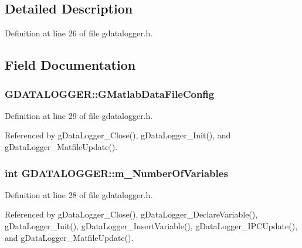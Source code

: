\subsection{Detailed Description}


Definition at line 26 of file gdatalogger.\-h.



\subsection{Field Documentation}
\hypertarget{structGDATALOGGER_a062fd3836dbd0b1bec129ab372bff04a}{
\subsubsection[{G\-Matlab\-Data\-File\-Config}]{ G\-D\-A\-T\-A\-L\-O\-G\-G\-E\-R\-::\-G\-Matlab\-Data\-File\-Config}}\label{structGDATALOGGER_a062fd3836dbd0b1bec129ab372bff04a}


Definition at line 29 of file gdatalogger.\-h.



Referenced by g\-Data\-Logger\-\_\-\-Close(), g\-Data\-Logger\-\_\-\-Init(), and g\-Data\-Logger\-\_\-\-Matfile\-Update().

\hypertarget{structGDATALOGGER_a2ac727ee6c50f7e04030cbe531158f08}{
\subsubsection[{m\-\_\-\-Number\-Of\-Variables}]{\setlength{\rightskip}{0pt plus 5cm}int G\-D\-A\-T\-A\-L\-O\-G\-G\-E\-R\-::m\-\_\-\-Number\-Of\-Variables}}\label{structGDATALOGGER_a2ac727ee6c50f7e04030cbe531158f08}


Definition at line 28 of file gdatalogger.\-h.



Referenced by g\-Data\-Logger\-\_\-\-Close(), g\-Data\-Logger\-\_\-\-Declare\-Variable(), g\-Data\-Logger\-\_\-\-Init(), g\-Data\-Logger\-\_\-\-Insert\-Variable(), g\-Data\-Logger\-\_\-\-I\-P\-C\-Update(), and g\-Data\-Logger\-\_\-\-Matfile\-Update().


